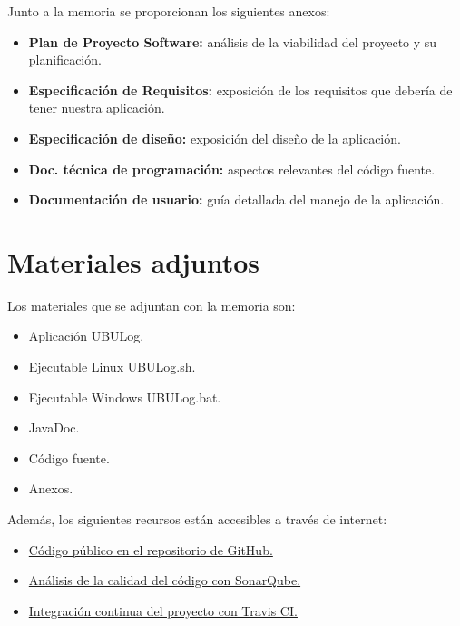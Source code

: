 Junto a la memoria se proporcionan los siguientes anexos:

\begin{itemize}
	\tightlist
	\item
	\textbf{Plan de Proyecto Software:} análisis de la viabilidad del proyecto y su planificación.
	\item
	\textbf{Especificación de Requisitos:} exposición de los requisitos que debería de tener nuestra aplicación.
	\item
	\textbf{Especificación de diseño:} exposición del diseño de la aplicación.
	\item
	\textbf{Doc. técnica de programación:} aspectos relevantes del código fuente.
	\item
	\textbf{Documentación de usuario:} guía detallada del manejo de la aplicación.
\end{itemize}

\section{Materiales adjuntos}\label{materiales-adjuntos}

Los materiales que se adjuntan con la memoria son: 

\begin{itemize}
	\tightlist
	\item
	Aplicación UBULog.
	\item
	Ejecutable Linux UBULog.sh.
	\item
	Ejecutable Windows UBULog.bat.	
	\item
	JavaDoc.
	\item
	Código fuente.
	\item
	Anexos.
\end{itemize}

Además, los siguientes recursos están accesibles a través de internet:

\begin{itemize}
	\tightlist
	\item
	\href{https://github.com/trona85/GII-17.1B-UBULog-1.0}{Código público en el repositorio de GitHub.}
	\item
	\href{https://sonarcloud.io/dashboard?id=GII-17.1B-UBULog-1.0}{Análisis de la calidad del código con SonarQube.}
	\item
	\href{https://travis-ci.org/trona85/GII-17.1B-UBULog-1.0/}{Integración continua del proyecto con Travis CI.}
	
\end{itemize}



